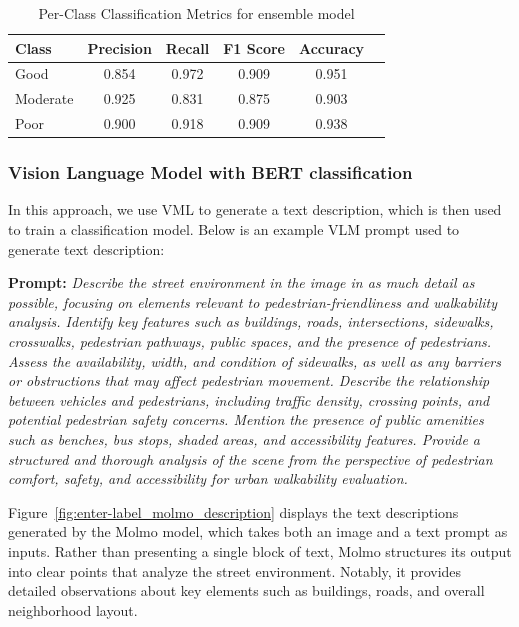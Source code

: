 \documentclass[11pt]{article}
\begin{document}
\begin{table}[H]
\centering
\caption{Per-Class Classification Metrics for ensemble model}
\label{tab:ensemble}
\begin{tabular}{lccccc}
\hline
\textbf{Class} & \textbf{Precision} & \textbf{Recall} & \textbf{F1 Score} & \textbf{Accuracy} \\
\hline
Good     & 0.854 & 0.972 & 0.909 & 0.951 \\
Moderate & 0.925 & 0.831 & 0.875 & 0.903 \\
Poor     & 0.900 & 0.918 & 0.909 & 0.938 \\
\hline
\end{tabular}
\end{table}


\subsubsection{Vision Language Model with BERT classification}
In this approach, we use VML to generate a text description, which is then used to train a classification model. Below is an example VLM prompt used to generate text description: \newline

\textbf{Prompt:} \textit{Describe the street environment in the image in as much detail as possible, focusing on elements relevant to pedestrian-friendliness and walkability analysis. Identify key features such as buildings, roads, intersections, sidewalks, crosswalks, pedestrian pathways, public spaces, and the presence of pedestrians. Assess the availability, width, and condition of sidewalks, as well as any barriers or obstructions that may affect pedestrian movement. Describe the relationship between vehicles and pedestrians, including traffic density, crossing points, and potential pedestrian safety concerns. Mention the presence of public amenities such as benches, bus stops, shaded areas, and accessibility features. Provide a structured and thorough analysis of the scene from the perspective of pedestrian comfort, safety, and accessibility for urban walkability evaluation.}   \newline


Figure~\ref{fig:enter-label_molmo_description} displays the text descriptions generated by the Molmo model, which takes both an image and a text prompt as inputs. Rather than presenting a single block of text, Molmo structures its output into clear points that analyze the street environment. Notably, it provides detailed observations about key elements such as buildings, roads, and overall neighborhood layout.
\end{document}
